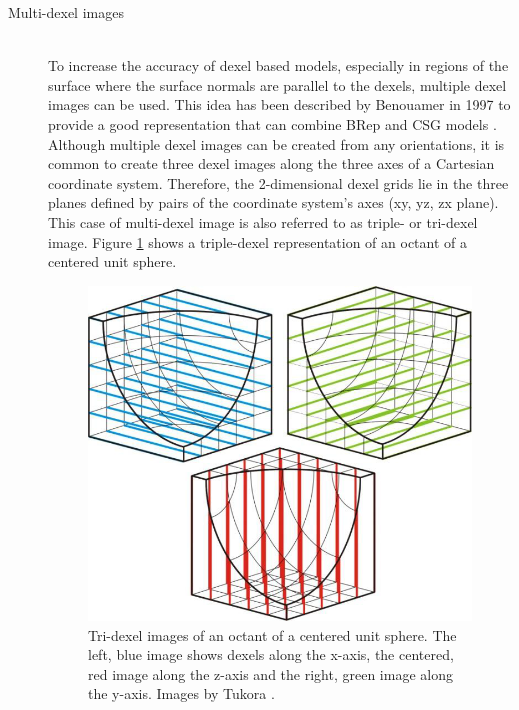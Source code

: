 \begin{description}
		
	\item[Multi-dexel images] \hfill \\
	To increase the accuracy of dexel based models, especially in regions of the surface where the surface normals are parallel to the dexels, multiple dexel images can be used.
	This idea has been described by Benouamer \etal in 1997 to provide a good representation that can combine BRep and CSG models \cite{tridexel_intersection}.
	Although multiple dexel images can be created from any orientations, it is common to create three dexel images along the three axes of a Cartesian coordinate system.
	Therefore, the 2-dimensional dexel grids lie in the three planes defined by pairs of the coordinate system's axes (xy, yz, zx plane).
	This case of multi-dexel image is also referred to as triple- or tri-dexel image.
	Figure \ref{fig:tri_dexel_image} shows a triple-dexel representation of an octant of a centered unit sphere.
	
	\begin{figure}[h]
		\centering
		\includegraphics[width=\textwidth]{images/tridexels}
		\caption{
			Tri-dexel images of an octant of a centered unit sphere.
			The left, blue image shows dexels along the x-axis, the centered, red image along the z-axis and the right, green image along the y-axis.
			Images by Tukora \cite{virtual_machining_review}.
		}
		\label{fig:tri_dexel_image}
	\end{figure}



\end{description}
